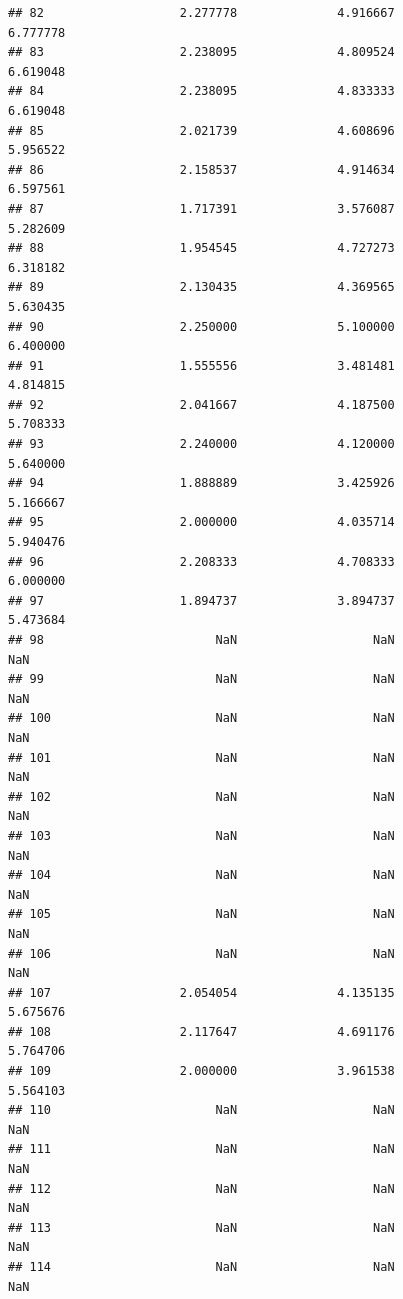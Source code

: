 \documentclass[]{article}
\begin{document}
\begin{verbatim}
## 82                   2.277778              4.916667                 6.777778
## 83                   2.238095              4.809524                 6.619048
## 84                   2.238095              4.833333                 6.619048
## 85                   2.021739              4.608696                 5.956522
## 86                   2.158537              4.914634                 6.597561
## 87                   1.717391              3.576087                 5.282609
## 88                   1.954545              4.727273                 6.318182
## 89                   2.130435              4.369565                 5.630435
## 90                   2.250000              5.100000                 6.400000
## 91                   1.555556              3.481481                 4.814815
## 92                   2.041667              4.187500                 5.708333
## 93                   2.240000              4.120000                 5.640000
## 94                   1.888889              3.425926                 5.166667
## 95                   2.000000              4.035714                 5.940476
## 96                   2.208333              4.708333                 6.000000
## 97                   1.894737              3.894737                 5.473684
## 98                        NaN                   NaN                      NaN
## 99                        NaN                   NaN                      NaN
## 100                       NaN                   NaN                      NaN
## 101                       NaN                   NaN                      NaN
## 102                       NaN                   NaN                      NaN
## 103                       NaN                   NaN                      NaN
## 104                       NaN                   NaN                      NaN
## 105                       NaN                   NaN                      NaN
## 106                       NaN                   NaN                      NaN
## 107                  2.054054              4.135135                 5.675676
## 108                  2.117647              4.691176                 5.764706
## 109                  2.000000              3.961538                 5.564103
## 110                       NaN                   NaN                      NaN
## 111                       NaN                   NaN                      NaN
## 112                       NaN                   NaN                      NaN
## 113                       NaN                   NaN                      NaN
## 114                       NaN                   NaN                      NaN

\end{verbatim}
\end{document}
